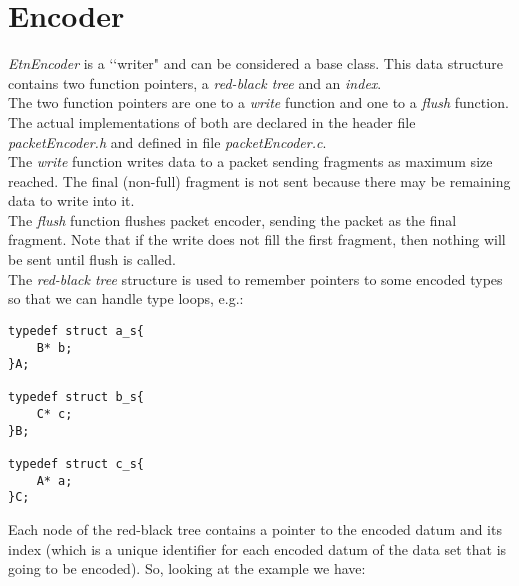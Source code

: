 


\section*{Encoder}
\emph{EtnEncoder} is a \lq\lq writer" and can be considered a base class. This data structure contains two function pointers, a \emph{red-black tree} and an \emph{index}.\\
The two function pointers are one to a \emph{write} function and one to a \emph{flush} function. The actual implementations of both are declared in the header file \emph{packetEncoder.h} and defined in file \emph{packetEncoder.c}.\\
The \emph{write} function  writes data to a packet sending fragments as maximum size reached. The final (non-full) fragment is not sent because there may be remaining data to write into it.\\
The \emph{flush} function flushes packet encoder, sending the packet as the final fragment. Note that if the write does not fill the first fragment, then nothing will be sent until flush is called.\\
The \emph{red-black tree} structure is used to remember pointers to some encoded types so that we can handle type loops, e.g.:

\begin{lstlisting}
typedef struct a_s{
	B* b;
}A;

typedef struct b_s{
	C* c;
}B;

typedef struct c_s{
	A* a;
}C;
\end{lstlisting}

Each node of the red-black tree contains a pointer to the encoded datum and its index (which is a unique identifier for each encoded datum of the data set that is going to be encoded). So, looking at the example we have:

